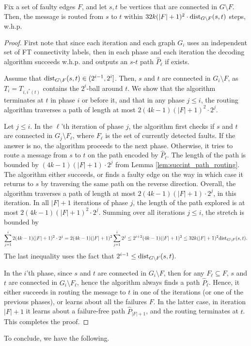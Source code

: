 \begin{claim}\label{cl:route-length}
Fix a set of faulty edges $F$, and let $s,t$ be vertices that are connected in $G \setminus F$. Then, the message is routed from $s$ to $t$ within $32k (|F|+1)^2 \cdot \mbox{\rm dist}_{G \setminus F}(s,t)$ steps, w.h.p.
\end{claim}
\begin{proof}
First note that since each iteration and each graph $G_{i}$ uses an independent set of FT connectivity labels, then in each phase and each iteration the decoding algorithm succeeds w.h.p. and outputs an $s$-$t$ path $\widehat{P}_\ell$ if exists. 

Assume that $\mbox{\rm dist}_{G \setminus F}(s,t) \in (2^{i-1},2^i]$. Then, $s$ and $t$ are connected in $G_i \setminus F$, as $T_i = T_{i,i^*(t)}$ contains the $2^i$-ball around $t$. We show that the algorithm terminates at $t$ in phase $i$ or before it, and that in any phase $j \leq i$, the routing algorithm traverses a path of length at most $2(4k-1)(|F|+1)^2 \cdot 2^j$.

Let $j \leq i$. In the $\ell$'th iteration of phase $j$, the algorithm first checks if $s$ and $t$ are connected in $G_j \setminus F_{\ell}$, where $F_{\ell}$ is the set of currently detected faults. If the answer is no, the algorithm proceeds to the next phase. Otherwise, it tries to route a message from $s$ to $t$ on the path encoded by $\widehat{P}_{\ell}$. The length of the path is bounded by $(4k-1)(|F|+1)\cdot 2^j$ from Lemma \ref{lem:succint_path_routing}. The algorithm either succeeds, or finds a faulty edge on the way in which case it returns to $s$ by traversing the same path on the reverse direction. Overall, the algorithm traverses a path of length at most $2(4k-1)(|F|+1)\cdot 2^j$, in this iteration. In all $|F|+1$ iterations of phase $j$, the length of the path explored is at most $2(4k-1)(|F|+1)^2 \cdot 2^j$. Summing over all iterations $j \leq i$, the stretch is bounded by $$\sum_{j=1}^{i} 2(4k-1)(|F|+1)^2 \cdot 2^j = 2(4k-1)(|F|+1)^2 \sum_{j=1}^i 2^j \leq 2^{i+2} (4k-1)(|F|+1)^2 \leq 32k (|F|+1)^2 \mbox{\rm dist}_{G \setminus F}(s,t).$$ The last inequality uses the fact that $2^{i-1} \leq \mbox{\rm dist}_{G \setminus F}(s,t).$ 

In the $i$'th phase, since $s$ and $t$ are connected in $G_i \setminus F$, then for any $F_{\ell} \subseteq F$, $s$ and $t$ are connected in $G_i \setminus F_{\ell}$, hence the algorithm always finds a path $\widehat{P}_{\ell}$. Hence, it either succeeds in routing the message to $t$ in one of the iterations (or one of the previous phases), or learns about all the failures $F$. In the latter case, in iteration $|F|+1$ it learns about a failure-free path $\widehat{P}_{|F|+1}$, and the routing terminates at $t$. This completes the proof.
\end{proof}
To conclude, we have the following.

